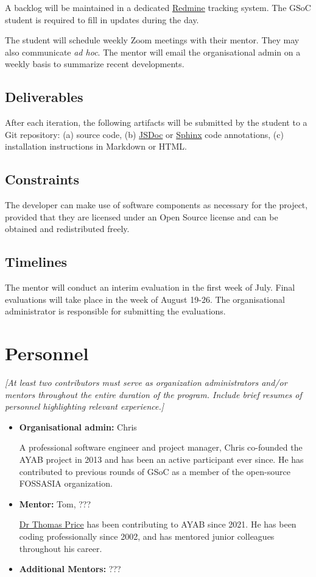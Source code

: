 \documentclass{article}
\begin{document}
A backlog will be maintained in a dedicated \href{http://www.redmine.org/}{Redmine} tracking system. The GSoC student is
required to fill in updates during the day.

The student will schedule weekly Zoom meetings with their mentor. They may also communicate \textit{ad hoc}. The mentor will email the organisational admin on a weekly basis to summarize recent developments.

\subsection{Deliverables}
After each iteration, the following artifacts will be submitted by the student to a Git repository: (a) source code, (b) \href{https://jsdoc.app/}{JSDoc} or \href{https://www.sphinx-doc.org/en/master/}{Sphinx} code annotations, (c) installation instructions in Markdown or HTML.

\subsection{Constraints}
The developer can make use of software components as necessary for the project, provided that they are licensed under an Open Source license and can be obtained and redistributed freely.

\subsection{Timelines}
The mentor will conduct an interim evaluation in the first week of July. Final evaluations will take place in the week of August 19-26. The organisational administrator is responsible for submitting the evaluations.


\section{Personnel}

{\itshape 
[At least two contributors must serve as organization administrators and/or mentors throughout the entire duration of the program. Include brief resumes of personnel highlighting relevant experience.]
}

\begin{itemize}
\item \textbf{Organisational admin:} Chris

A professional software engineer and project manager, Chris co-founded the AYAB project in 2013 and has been an active participant ever since. He has contributed to previous rounds of GSoC as a member of the open-source FOSSASIA organization.

\item \textbf{Mentor:} Tom, ???

\href{https://t0mpr1c3.github.io/}{Dr Thomas Price} has been contributing to AYAB since 2021. He has been coding professionally since 2002, and has mentored junior colleagues throughout his career.

\item \textbf{Additional Mentors:} ???
\end{itemize}
\end{document}
